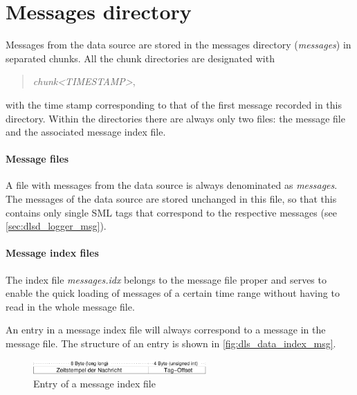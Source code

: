 \documentclass[a4paper,12pt,BCOR6mm,bibtotoc,idxtotoc]{scrbook}
\begin{document}

\section{Messages directory}
\label{sec:data_msg}

Messages from the data source are stored in the messages directory (\textit{messages}) in separated chunks. All the chunk directories are designated with

\begin{quote} \textit{chunk\textless TIMESTAMP\textgreater}, \end{quote}

with the time stamp corresponding to that of the first message recorded in this directory. Within the directories there are always only two files: the message file and the associated message index file.

\paragraph{Message files} A file with messages from the data source is always
denominated as \textit{messages}. The messages of the data source are stored
unchanged in this file, so that this contains only single SML tags that
correspond to the respective messages (see \autoref{sec:dlsd_logger_msg}).

\paragraph{Message index files} The index file \textit{messages.idx} belongs to the message file proper and serves to enable the quick loading of messages of a certain time range without having to read in the whole message file.

An entry in a message index file will always correspond to a message in the
message file. The structure of an entry is shown in
\autoref{fig:dls_data_index_msg}.

\begin{figure}[htb] \begin{center} \includegraphics[height=15pt]{bilder/dls_data_index_msg} \end{center} \caption{Entry of a message index file} \label{fig:dls_data_index_msg} \end{figure}
\end{document}
